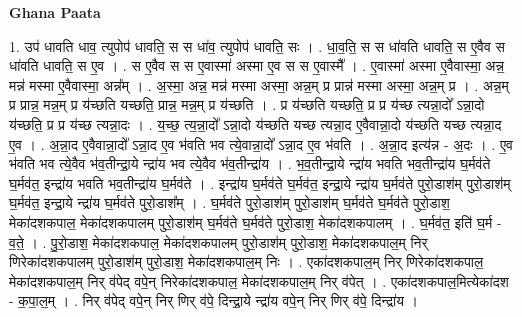 \documentclass[17pt]{extarticle}
\begin{document}
\textbf{Ghana Paata } \newline

1. उप॑ धावति धाव॒ त्युपोप॑ धावति॒ स स धा॑व॒ त्युपोप॑ धावति॒ सः । . धा॒व॒ति॒ स स धा॑वति धावति॒ स ए॒वैव स धा॑वति धावति॒ स ए॒व । . स ए॒वैव स स ए॒वास्मा॑ अस्मा ए॒व स स ए॒वास्मै᳚ । . ए॒वास्मा॑ अस्मा ए॒वैवास्मा॒ अन्न॒ मन्न॑ मस्मा ए॒वैवास्मा॒ अन्न᳚म् । . अ॒स्मा॒ अन्न॒ मन्न॑ मस्मा अस्मा॒ अन्न॒म् प्र प्रान्न॑ मस्मा अस्मा॒ अन्न॒म् प्र । . अन्न॒म् प्र प्रान्न॒ मन्न॒म् प्र य॑च्छति यच्छति॒ प्रान्न॒ मन्न॒म् प्र य॑च्छति । . प्र य॑च्छति यच्छति॒ प्र प्र य॑च्छ त्यन्ना॒दो᳚ ऽन्ना॒दो य॑च्छति॒ प्र प्र य॑च्छ त्यन्ना॒दः । . य॒च्छ॒ त्य॒न्ना॒दो᳚ ऽन्ना॒दो य॑च्छति यच्छ त्यन्ना॒द ए॒वैवान्ना॒दो य॑च्छति यच्छ त्यन्ना॒द ए॒व । . अ॒न्ना॒द ए॒वैवान्ना॒दो᳚ ऽन्ना॒द ए॒व भ॑वति भव त्ये॒वान्ना॒दो᳚ ऽन्ना॒द ए॒व भ॑वति । . अ॒न्ना॒द इत्य॑न्न - अ॒दः । . ए॒व भ॑वति भव त्ये॒वैव भ॑व॒तीन्द्रा॒ये न्द्रा॑य भव त्ये॒वैव भ॑व॒तीन्द्रा॑य । . भ॒व॒तीन्द्रा॒ये न्द्रा॑य भवति भव॒तीन्द्रा॑य घ॒र्मव॑ते घ॒र्मव॑त॒ इन्द्रा॑य भवति भव॒तीन्द्रा॑य घ॒र्मव॑ते । . इन्द्रा॑य घ॒र्मव॑ते घ॒र्मव॑त॒ इन्द्रा॒ये न्द्रा॑य घ॒र्मव॑ते पुरो॒डाश॑म् पुरो॒डाश॑म् घ॒र्मव॑त॒ इन्द्रा॒ये न्द्रा॑य घ॒र्मव॑ते पुरो॒डाश᳚म् । . घ॒र्मव॑ते पुरो॒डाश॑म् पुरो॒डाश॑म् घ॒र्मव॑ते घ॒र्मव॑ते पुरो॒डाश॒ मेका॑दशकपाल॒ मेका॑दशकपालम् पुरो॒डाश॑म् घ॒र्मव॑ते घ॒र्मव॑ते पुरो॒डाश॒ मेका॑दशकपालम् । . घ॒र्मव॑त॒ इति॑ घ॒र्म - व॒ते॒ । . पु॒रो॒डाश॒ मेका॑दशकपाल॒ मेका॑दशकपालम् पुरो॒डाश॑म् पुरो॒डाश॒ मेका॑दशकपाल॒म् निर् णिरेका॑दशकपालम् पुरो॒डाश॑म् पुरो॒डाश॒ मेका॑दशकपाल॒म् निः । . एका॑दशकपाल॒म् निर् णिरेका॑दशकपाल॒ मेका॑दशकपाल॒म् निर् व॑पेद् वपे॒न् निरेका॑दशकपाल॒ मेका॑दशकपाल॒म् निर् व॑पेत् । . एका॑दशकपाल॒मित्येका॑दश - क॒पा॒ल॒म् । . निर् व॑पेद् वपे॒न् निर् णिर् व॑पे॒ दिन्द्रा॒ये न्द्रा॑य वपे॒न् निर् णिर् व॑पे॒ दिन्द्रा॑य । \newline
\end{document}
